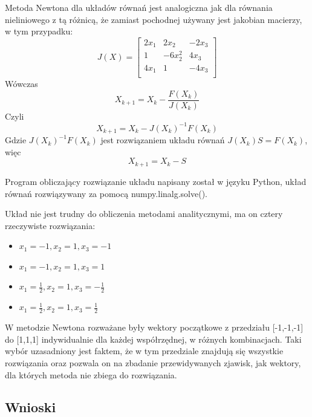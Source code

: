\documentclass{article}
\begin{document}
Metoda Newtona dla układów równań jest analogiczna jak dla równania nieliniowego z tą różnicą, że zamiast pochodnej używany
jest jakobian macierzy, w tym przypadku:
$$J(X)=
\begin{bmatrix}
    2x_1 & 2x_2 & -2x_3 \\
    1 & -6x_2^2 & 4x_3 \\
    4x_1 & 1 & -4x_3 \\
\end{bmatrix}
$$
Wówczas
$$X_{k+1} = X_k - \frac{F(X_k)}{J(X_k)}$$
Czyli
$$X_{k+1} = X_k - J(X_k)^{-1}F(X_k)$$
Gdzie $J(X_k)^{-1}F(X_k)$ jest rozwiązaniem układu równań $J(X_k)S = F(X_k)$, więc
$$X_{k+1} = X_k - S$$

Program obliczający rozwiązanie układu napisany został w języku Python, układ równań rozwiązywany za pomocą numpy.linalg.solve().

Układ nie jest trudny do obliczenia metodami analitycznymi, ma on cztery rzeczywiste rozwiązania:
\begin{itemize}
    \item 
    $x_1= -1, x_2= 1, x_3= -1$
    \item 
    $x_1= -1, x_2= 1, x_3= 1$
    \item 
    $x_1= \frac{1}{2}, x_2= 1, x_3= -\frac{1}{2}$
    \item 
    $x_1= \frac{1}{2}, x_2= 1, x_3= \frac{1}{2}$
\end{itemize}

W metodzie Newtona rozważane były wektory początkowe z przedziału [-1,-1,-1] do [1,1,1] indywidualnie dla każdej współrzędnej, 
w różnych kombinacjach. Taki wybór uzasadniony jest faktem, że w tym przedziale znajdują się wszystkie rozwiązania oraz pozwala on
na zbadanie przewidywanych zjawisk, jak wektory, dla których metoda nie zbiega do rozwiązania.

\subsection{Wnioski}
\end{document}
